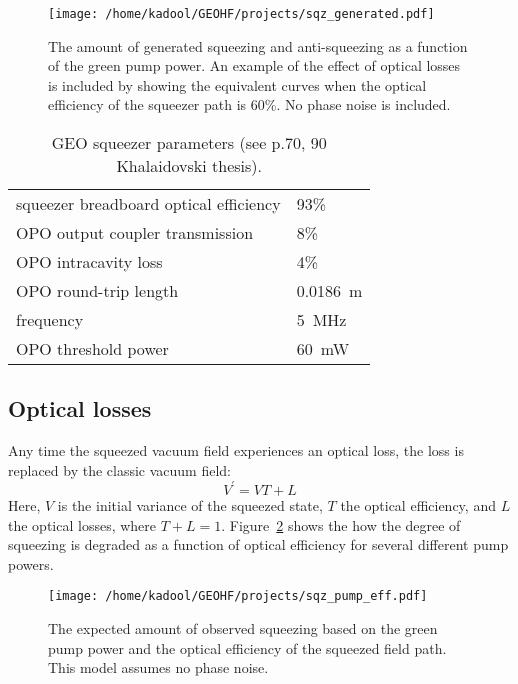 \documentclass{ligodoc}
\begin{document}
\begin{figure}
\begin{centering}
\texttt{[image: /home/kadool/GEOHF/projects/sqz\_generated.pdf]}
\caption{The amount of generated squeezing and anti-squeezing as a
  function of the green pump power. An example of the effect of
  optical losses is included by showing the equivalent curves when the
  optical efficiency of the squeezer path is 60\%. No phase noise is
  included.}
\label{fig:sqz_generated}
\end{centering}
\end{figure}

\begin{table}
\centering
\caption{GEO squeezer parameters (see p.70, 90 Khalaidovski thesis).}
\begin{tabular}{l l}
\hline
squeezer breadboard optical efficiency & 93\% \\
OPO output coupler transmission & 8\%\\
OPO intracavity loss & 4\%\\
OPO round-trip length & 0.0186~m\\
frequency & 5~MHz\\
OPO threshold power & 60~mW\\
\hline
\end{tabular}
\label{tab:GEOsqz_params}
\end{table}


\subsection{Optical losses}
Any time the squeezed vacuum field experiences an optical loss, the
loss is replaced by the classic vacuum field:
\begin{equation}
V^\prime= VT + L
\end{equation}
Here, $V$ is the initial variance of the squeezed state, $T$ the optical
efficiency, and $L$ the optical losses, where
$T+L=1$. Figure~\ref{fig:sqzpumplosses} shows the how the degree of
squeezing is degraded as a function of optical efficiency for several
different pump powers.

\begin{figure}
\begin{centering}
\texttt{[image: /home/kadool/GEOHF/projects/sqz\_pump\_eff.pdf]}
\caption{The expected amount of observed squeezing based on the green
  pump power and the optical efficiency of the squeezed field path. This
  model assumes no phase noise.}
\label{fig:sqzpumplosses}
\end{centering}
\end{figure}
\end{document}
